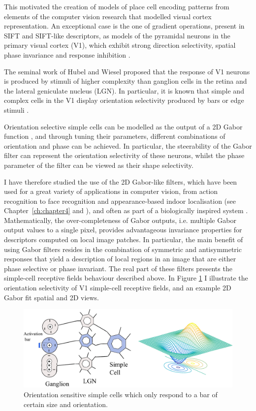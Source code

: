 This motivated the creation of models of place cell encoding patterns from elements of the computer vision research that modelled visual cortex representation. An exceptional case is the one of gradient operations, present in SIFT and SIFT-like descriptors, as models of the pyramidal neurons in the primary visual cortex (V1), which exhibit strong direction selectivity, spatial phase invariance and response inhibition \cite{hubel1962receptive, dhruv2014cascaded,carandini2006simple}.

The seminal work of Hubel and Wiesel \cite{hubel1962receptive} proposed that the response of V1 neurons is produced by stimuli of higher complexity than ganglion cells in the retina and the lateral geniculate nucleus (LGN). In particular, it is known that simple and complex cells in the V1 display orientation selectivity produced by bars or edge stimuli \cite{payne2001cat}.

Orientation selective simple cells can be modelled as the output of a 2D Gabor function \cite{daugman1985uncertainty}, and through tuning their parameters, different combinations of orientation and phase can be achieved. In particular, the steerability of the Gabor filter can represent the orientation selectivity of these neurons, whilst the phase parameter of the filter can be viewed as their shape selectivity. 

I have therefore studied the use of the 2D Gabor-like filters, which have been used for a great variety of applications in computer vision, from action recognition \cite{shu2014bio} to face recognition \cite{liao2013partial} and appearance-based indoor localisation (see Chapter~\ref{ch:chapter4} and \cite{Rivera-Rubio2015PRL}), and often as part of a biologically inspired system \cite{shu2014bio}. Mathematically, the over-completeness of Gabor outputs, i.e. multiple Gabor output values to a single pixel, provides advantageous invariance properties for descriptors computed on local image patches. In particular, the main benefit of using Gabor filters resides in the combination of symmetric and antisymmetric responses that yield a description of local regions in an image that are either phase selective or phase invariant. The real part of these filters presents the simple-cell receptive fields behaviour described above. In Figure \ref{fig:simple_cell} I illustrate the orientation selectivity of V1 simple-cell receptive fields, and an example 2D Gabor fit spatial and 2D views.


\begin{figure}[h]
\centering
\includegraphics[width=.8\textwidth]{gfx/Chapter05/simple_cell_gabor.pdf}
\caption{Orientation sensitive simple cells which only respond to a bar of certain size and orientation.}
\label{fig:simple_cell}
\end{figure}

